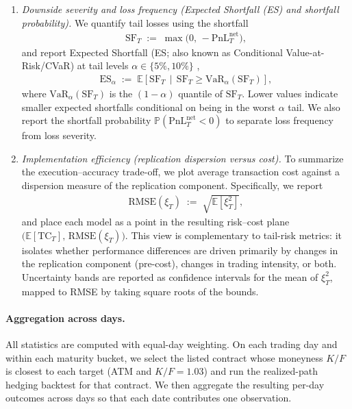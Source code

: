 \begin{enumerate}
\item \textit{Downside severity and loss frequency (Expected Shortfall (ES) and shortfall probability).}
We quantify tail losses using the shortfall
\begin{align}
\mathrm{SF}_T \;:=\; \max\!\bigl(0,\,-\mathrm{PnL}_T^{\mathrm{net}}\bigr),
\label{eq:sf_def}
\end{align}
and report Expected Shortfall (ES; also known as Conditional Value-at-Risk/CVaR) at tail levels $\alpha\in\{5\%,10\%\}$ \cite{rockafellar2000cvar},
\begin{align}
\mathrm{ES}_{\alpha} \;:=\; \mathbb{E}\!\left[\mathrm{SF}_T \,\middle|\, \mathrm{SF}_T \ge \mathrm{VaR}_{\alpha}(\mathrm{SF}_T)\right],
\label{eq:es_def}
\end{align}
where $\mathrm{VaR}_{\alpha}(\mathrm{SF}_T)$ is the $(1-\alpha)$ quantile of $\mathrm{SF}_T$.
Lower values indicate smaller expected shortfalls conditional on being in the worst $\alpha$ tail.
We also report the shortfall probability $\mathbb{P}(\mathrm{PnL}_T^{\mathrm{net}}<0)$ to separate loss frequency from loss severity.

\item \textit{Implementation efficiency (replication dispersion versus cost).}
To summarize the execution--accuracy trade-off, we plot average transaction cost against a dispersion measure of the replication component.
Specifically, we report
\begin{align}
\mathrm{RMSE}(\xi_T) \;:=\; \sqrt{\mathbb{E}\!\left[\xi_T^2\right]},
\label{eq:rmse_eps_def}
\end{align}
and place each model as a point in the resulting risk--cost plane $\bigl(\mathbb{E}[\mathrm{TC}_T],\,\mathrm{RMSE}(\xi_T)\bigr)$.
This view is complementary to tail-risk metrics: it isolates whether performance differences are driven primarily by changes in the replication component (pre-cost), changes in trading intensity, or both.
Uncertainty bands are reported as confidence intervals for the mean of $\xi_T^2$, mapped to RMSE by taking square roots of the bounds.
\end{enumerate}

\paragraph{Aggregation across days.}
All statistics are computed with equal-day weighting.
On each trading day and within each maturity bucket, we select the listed contract whose moneyness $K/F$ is closest to each target (ATM and $K/F=1.03$) and run the realized-path hedging backtest for that contract.
We then aggregate the resulting per-day outcomes across days so that each date contributes one observation.

